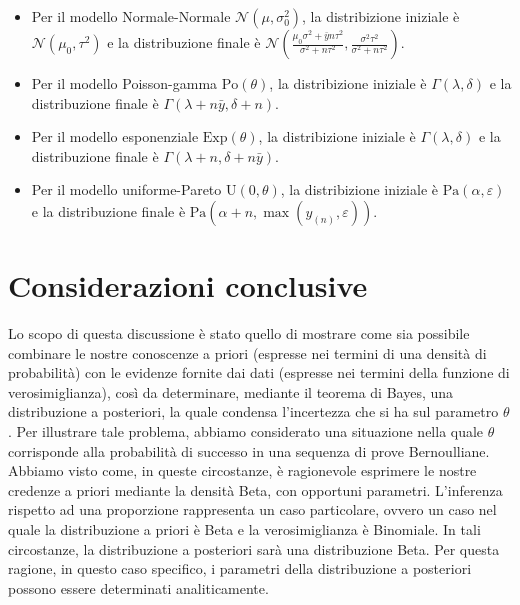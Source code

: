 \documentclass[
]{memoir}
\theoremstyle{definition}
\theoremstyle{definition}
\theoremstyle{definition}
\theoremstyle{definition}
\theoremstyle{remark}
\begin{document}
\begin{itemize}
\item
  Per il modello Normale-Normale \(\mathcal{N}(\mu, \sigma^2_0)\), la distribizione iniziale è \(\mathcal{N}(\mu_0, \tau^2)\) e la distribuzione finale è \(\mathcal{N}\left(\frac{\mu_0\sigma^2 + \bar{y}n\tau^2}{\sigma^2 + n\tau^2}, \frac{\sigma^2\tau^2}{\sigma^2 + n\tau^2} \right)\).
\item
  Per il modello Poisson-gamma \(\text{Po}(\theta)\), la distribizione iniziale è \(\Gamma(\lambda, \delta)\) e la distribuzione finale è \(\Gamma(\lambda + n \bar{y}, \delta +n)\).
\item
  Per il modello esponenziale \(\text{Exp}(\theta)\), la distribizione iniziale è \(\Gamma(\lambda, \delta)\) e la distribuzione finale è \(\Gamma(\lambda + n, \delta +n\bar{y})\).
\item
  Per il modello uniforme-Pareto \(\text{U}(0, \theta)\), la distribizione iniziale è \(\text{Pa}(\alpha, \varepsilon)\) e la distribuzione finale è \(\text{Pa}(\alpha + n, \max(y_{(n)}, \varepsilon))\).
\end{itemize}

\hypertarget{considerazioni-conclusive}{%
\section*{Considerazioni conclusive}\label{considerazioni-conclusive}}

Lo scopo di questa discussione è stato quello di mostrare come sia possibile combinare le nostre conoscenze a priori (espresse nei termini di una densità di probabilità) con le evidenze fornite dai dati (espresse nei termini della funzione di verosimiglianza), così da determinare, mediante il teorema di Bayes, una distribuzione a posteriori, la quale condensa l'incertezza che si ha sul parametro \(\theta\). Per illustrare tale problema, abbiamo considerato una situazione nella quale \(\theta\) corrisponde alla probabilità di successo in una sequenza di prove Bernoulliane. Abbiamo visto come, in queste circostanze, è ragionevole esprimere le nostre credenze a priori mediante la densità Beta, con opportuni parametri. L'inferenza rispetto ad una proporzione rappresenta un caso particolare, ovvero un caso nel quale la distribuzione a priori è Beta e la verosimiglianza è Binomiale. In tali circostanze, la distribuzione a posteriori sarà una distribuzione Beta. Per questa ragione, in questo caso specifico, i parametri della distribuzione a posteriori possono essere determinati analiticamente.

\hypertarget{appendix-appendix}{%
\appendix}


  
\end{document}
